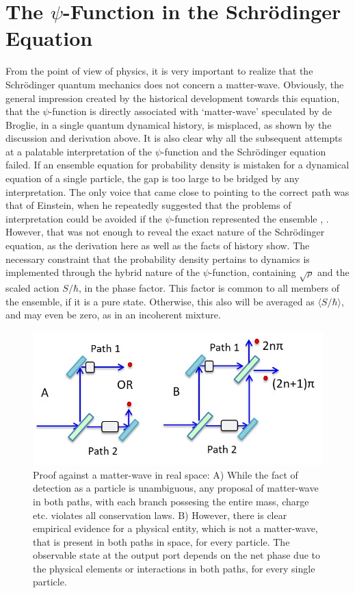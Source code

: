 \section{The $\psi$-Function in the Schr\"{o}dinger\\ Equation}\label{c14-sec3}

From the point of view of physics, it is very important to realize that the Schr\"{o}dinger
quantum mechanics does not concern a matter-wave. 
Obviously, the general impression created by the historical development towards
this equation, that the $\psi$-function is directly associated with `matter-wave' 
speculated by de Broglie, in a single quantum dynamical history, is misplaced, as shown by the discussion and
derivation above. It is also clear why all the subsequent attempts at a palatable interpretation 
of the $\psi$-function and the Schr\"{o}dinger equation failed. If an ensemble equation for probability
density is mistaken for a dynamical equation of a single particle, the gap is too large to be
bridged by any interpretation. The only voice that came close to pointing to the correct path
was that of Einstein, when he repeatedly suggested that the problems of interpretation could be
avoided if the $\psi$-function represented the ensemble \cite{chap14-key3}, \cite{chap14-key4}. However, that was not 
enough to reveal the exact nature of the Schr\"{o}dinger equation, as
the derivation here as well as the facts of history show. The necessary constraint that the probability density pertains to
dynamics is implemented through the hybrid nature of the $\psi$-function, containing $\sqrt{\rho}$ and
the scaled action $S/\hbar$, in the phase factor. This factor is common to all members
of the ensemble, if it is a pure state. Otherwise, this also will be averaged as $\langle S/\hbar\rangle$, and
may even be zero, as in an incoherent mixture.

\begin{figure}[t]
\centering
\includegraphics[scale=0.8]{src/images/chap27/1.jpg}
\caption{Proof against a matter-wave in real space: A) While the fact of detection as a particle is
unambiguous, any proposal of matter-wave in both paths, with each branch possesing the entire
mass, charge etc. violates all conservation laws. B) However, there is clear empirical evidence for
a physical entity, which is not a matter-wave, that is present in both paths in space, for every
particle. The observable state at the output port depends on the net phase due to the physical elements or interactions  
in both paths, for every single particle.}\label{ch14-fig1}
\end{figure}


